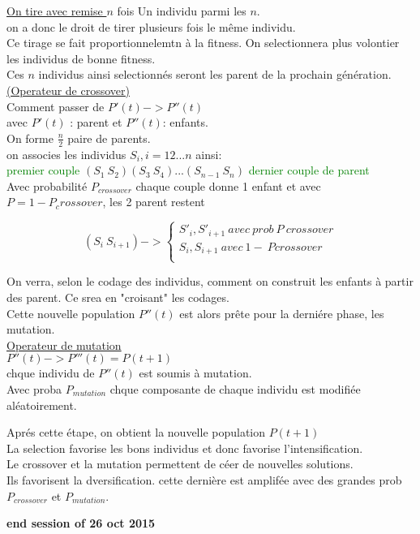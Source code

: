 \underline{On tire avec remise } $n$ fois
Un individu parmi les $n$.\\ on a donc le droit de tirer plusieurs fois le m\^eme individu.\\Ce tirage se fait proportionnelemtn \`a la fitness. On selectionnera plus volontier les individus de bonne fitness.\\
Ces $n$ individus ainsi selectionn\'es seront les parent de la prochain g\'en\'eration.\\
\underline{(Operateur de crossover)}\\
Comment passer de $P'(t)  -> P''(t)$\\
avec   $P'(t)$ : parent et   $P''(t)$: enfants.\\
On forme $\frac{n}{2}$ paire de parents.\\
\eg  on associes les individus $S_i, i=12... n $ ainsi:\\
\textcolor{green}{premier couple} $(S_1 \ S_2) (S_3 \ S_4) ... (S_{n-1} \ S_n)$ \textcolor{green}{dernier couple de parent}\\
Avec probabilit\'e $P_{crossover}$ chaque couple donne 1 enfant et avec $P = 1-P_crossover$, les 2 parent restent\\
\begin{center}
\[ (S_i \ S_{i+1})-> \left\{
                \begin{array}{ll}
                  S'_i,S'_{i+1}  \ avec\ prob\ P\ crossover \\
                  S_i, S_{i+1} 	 \ avec \ 1- \ Pcrossover\\
                  
                \end{array}
              \right.
  \]
\end{center}

On verra, selon le codage des individus, comment on construit les enfants \`a partir des parent. Ce srea en "croisant" les codages.\\
Cette nouvelle population $P''(t)$ est alors pr\^ete pour la derni\'ere phase, les mutation.\\

\underline{Operateur de mutation}\\
$P''(t) -> P'''(t) = P(t+1)$\\
chque individu de $P''(t)$ est soumis \`a mutation.\\
Avec proba $P_{mutation}$ chque composante de chaque individu est modifi\'ee al\'eatoirement.

Apr\'es cette \'etape, on obtient la nouvelle population $P(t+1)$ \\
La selection favorise les bons individus et donc favorise l'intensification.\\
Le crossover et la mutation permettent de c\'eer de nouvelles solutions.\\
Ils favorisent la dversification. cette derni\`ere est amplif\'ee avec des grandes prob $P_{crossover}$ et $P_{mutation}$.


\hfill\LARGE\textbf{end session of 26 oct 2015}